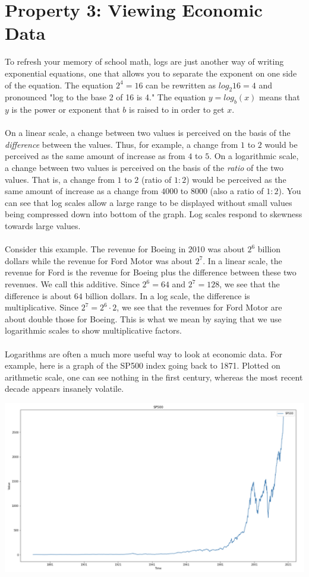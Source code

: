\documentclass[11pt, oneside]{article}   	%
\begin{document}
\section{Property 3:  Viewing Economic Data}
To refresh your memory of school math, logs are just another way of writing exponential equations, one that allows you to separate the exponent on one side of the equation. The equation $2^4 = 16$ can be rewritten as $log_2 16 = 4$ and pronounced "log to the base 2 of 16 is 4." The equation $y = log_b (x)$ means that $y$ is the power or exponent that $b$ is raised to in order to get $x$.
\\
\\
On a linear scale, a change between two values is perceived on the basis of the \emph{difference} between the values. Thus, for example, a change from $1$ to $2$ would be perceived as the same amount of increase as from $4$ to $5$. On a logarithmic scale, a change between two values is perceived on the basis of the \emph{ratio} of the two values. That is, a change from $1$ to $2$ (ratio of $1:2$) would be perceived as the same amount of increase as a change from $4000$ to $8000$ (also a ratio of $1:2$). You can see that log scales allow a large range to be displayed without small values being compressed down into bottom of the graph. Log scales respond to skewness towards large values.
\\
\\
Consider this example. The revenue for Boeing in 2010 was about $2^6$ billion dollars while the revenue for Ford Motor was about $2^7$. In a linear scale, the revenue for Ford is the revenue for Boeing plus the difference between these two revenues. We call this additive. Since $2^6 = 64$ and $2^7 = 128$, we see that the difference is about $64$ billion dollars. In a log scale, the difference is multiplicative. Since $2^7 = 2^6 \cdot 2$, we see that the revenues for Ford Motor are about double those for Boeing. This is what we mean by saying that we use logarithmic scales to show multiplicative factors.
\\
\\
Logarithms are often a much more useful way to look at economic data. For example, here is a graph of the SP500 index going back to 1871. Plotted on arithmetic scale, one can see nothing in the  first century, whereas the most recent decade appears insanely volatile.
\begin{center}
	\includegraphics[scale=0.4]{sp500_arithmetic.png}
\end{center}
\end{document}
